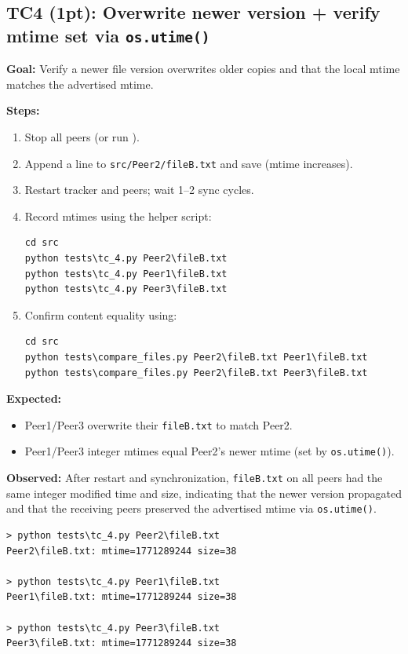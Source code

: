 \documentclass[11pt]{article}
\begin{document}
\subsection{TC4 (1pt): Overwrite newer version + verify mtime set via \texttt{os.utime()}}
\textbf{Goal:} Verify a newer file version overwrites older copies and that the local mtime matches the advertised mtime.

\textbf{Steps:}
\begin{enumerate}[noitemsep]
  \item Stop all peers (or run ).
  \item Append a line to \texttt{src/Peer2/fileB.txt} and save (mtime increases).
  \item Restart tracker and peers; wait 1--2 sync cycles.
  \item Record mtimes using the helper script:
\begin{lstlisting}
cd src
python tests\tc_4.py Peer2\fileB.txt
python tests\tc_4.py Peer1\fileB.txt
python tests\tc_4.py Peer3\fileB.txt
\end{lstlisting}
  \item Confirm content equality using:
\begin{lstlisting}
cd src
python tests\compare_files.py Peer2\fileB.txt Peer1\fileB.txt
python tests\compare_files.py Peer2\fileB.txt Peer3\fileB.txt
\end{lstlisting}
\end{enumerate}

\textbf{Expected:}
\begin{itemize}[noitemsep]
  \item Peer1/Peer3 overwrite their \texttt{fileB.txt} to match Peer2.
  \item Peer1/Peer3 integer mtimes equal Peer2's newer mtime (set by \texttt{os.utime()}).
\end{itemize}

\textbf{Observed:} After restart and synchronization, \texttt{fileB.txt} on all peers had the same integer modified time and size, indicating that the newer version propagated and that the receiving peers preserved the advertised mtime via \texttt{os.utime()}.
\begin{lstlisting}
> python tests\tc_4.py Peer2\fileB.txt
Peer2\fileB.txt: mtime=1771289244 size=38

> python tests\tc_4.py Peer1\fileB.txt
Peer1\fileB.txt: mtime=1771289244 size=38

> python tests\tc_4.py Peer3\fileB.txt
Peer3\fileB.txt: mtime=1771289244 size=38
\end{lstlisting}
\end{document}

